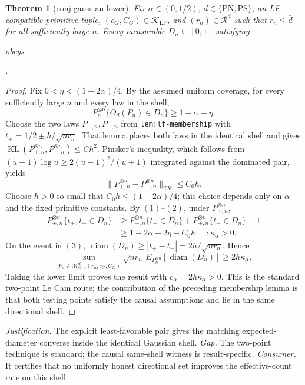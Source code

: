 \documentclass{article}
\newtheorem{theorem}{Theorem}
\begin{document}
\begin{theorem}[conj:gaussian-lower]\label{conj:gaussian-lower}
Fix \(\alpha\in(0,1/2)\), \(d\in\{\mathrm{PN},\mathrm{PS}\}\), an LF-compatible primitive tuple, \((c_G,C_G)\in\mathcal K_{\mathrm{LF}}\), and \((r_n)\in\mathcal R^d\) such that \(r_n\le\bar d\) for all sufficiently large \(n\). Every measurable \(D_n\subseteq[0,1]\) satisfying \par\noindent {}\par\noindent obeys \par\noindent {}\par\noindent.
\end{theorem}
\begin{proof}
Fix \(0<\eta<(1-2\alpha)/4\). By the assumed uniform coverage, for every sufficiently large \(n\) and every law in the shell,
\[P_n^{\otimes n}\{\Theta_d(P_n)\in D_n\}\ge1-\alpha-\eta.\tag{1}\]
Choose the two laws \(P_{+,n},P_{-,n}\) from \texttt{lem:lf-membership} with \(t_\pm=1/2\pm h/\sqrt{nr_n}\). That lemma places both laws in the identical shell and gives \(\operatorname{KL}(P_{+,n}^{\otimes n},P_{-,n}^{\otimes n})\le C h^2\). Pinsker's inequality, which follows from \((u-1)\log u\ge2(u-1)^2/(u+1)\) integrated against the dominated pair, yields
\[\lVert P_{+,n}^{\otimes n}-P_{-,n}^{\otimes n}\rVert_{\mathrm{TV}}\le C_0h.\tag{2}\]
Choose \(h>0\) so small that \(C_0h\le(1-2\alpha)/4\); this choice depends only on \(\alpha\) and the fixed primitive constants. By \((1)\)--\((2)\), under \(P_{+,n}^{\otimes n}\),
\[\begin{aligned}P_{+,n}^{\otimes n}\{t_+,t_-\in D_n\}&\ge P_{+,n}^{\otimes n}\{t_+\in D_n\}+P_{+,n}^{\otimes n}\{t_-\in D_n\}-1\\&\ge1-2\alpha-2\eta-C_0h=:\kappa_\alpha>0.\end{aligned}\tag{3}\]
On the event in \((3)\), \(\operatorname{diam}(D_n)\ge|t_+-t_-|=2h/\sqrt{nr_n}\). Hence
\[\sup_{P_n\in\mathcal M_{G,n}^d(r_n;c_G,C_G)}\sqrt{nr_n}\,E_{P_n^{\otimes n}}[\operatorname{diam}(D_n)]\ge2h\kappa_\alpha.\tag{4}\]
Taking the lower limit proves the result with \(c_\alpha=2h\kappa_\alpha>0\). This is the standard two-point Le Cam route; the contribution of the preceding membership lemma is that both testing points satisfy the causal assumptions and lie in the same directional shell.
\end{proof}
\par\smallskip\noindent \textit{Justification.} The explicit least-favorable pair gives the matching expected-diameter converse inside the identical Gaussian shell. \textit{Gap.} The two-point technique is standard; the causal same-shell witness is result-specific. \textit{Consumer.} It certifies that no uniformly honest directional set improves the effective-count rate on this shell.
\end{document}
